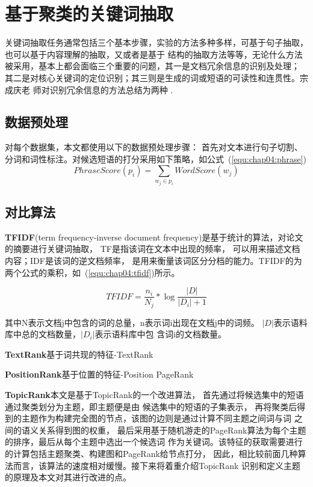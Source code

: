 ﻿\chapter{基于聚类的关键词抽取}
关键词抽取任务通常包括三个基本步骤，实验的方法多种多样，可基于句子抽取，也可以基于内容理解的抽取，又或者是基于%
结构的抽取方法等等，无论什么方法被采用，基本上都会面临三个重要的问题，其一是文档冗余信息的识别及处理；%
其二是对核心关键词的定位识别；其三则是生成的词或短语的可读性和连贯性。宗成庆老%
师对识别冗余信息的方法总结为两种%
.
\section{数据预处理}
对每个数据集，本文都使用以下的数据预处理步骤：%
首先对文本进行句子切割、分词和词性标注。对候选短语的打分采用如下策略，如公式~(\ref{equ:chap04:phrase})
\begin{equation}
\label{equ:chap04:phrase}
PhraseScore(p_i) = \sum\limits_{{w_j}\in {p_i}} WordScore(w_j)
\end{equation}

\section{对比算法}

\textbf{TFIDF}(term frequency-inverse %
document frequency)是基于统计的算法，对论文的摘要进行关键词抽取，%
TF是指该词在文本中出现的频率，%
可以用来描述文档内容；IDF是该词的逆文档频率，%
是用来衡量该词区分分档的能力。TFIDF的为两个公式的乘积，如~(\ref{equ:chap04:tfidf})所示。

\begin{equation}
\label{equ:chap04:tfidf}
TFIDF = {\frac{n_i}{N_j}*\log\frac{|D|}{|D_i| + 1}}
\end{equation}

其中N表示文档j中包含的词的总量，n表示词i出现在文档j中的词频。%
$|D|$表示语料库中总的文档数量，$|D_i|$表示语料库中包%
含词i的文档数量。%

\textbf{TextRank}基于词共现的特征-TextRank

\textbf{PositionRank}基于位置的特征-Position PageRank

\textbf{TopicRank}本文是基于TopicRank的一个改进算法，%
首先通过将候选集中的短语通过聚类划分为主题，即主题便是由%
候选集中的短语的子集表示，
再将聚类后得到的主题作为构建完全图的节点，该图的边则是通过计算不同主题之间词与词%
之间的语义关系得到图的权重，%
最后采用基于随机游走的PageRank算法为每个主题的排序，最后从每个主题中选出一个候选词%
作为关键词。该特征的获取需要进行的计算包括主题聚类、构建图和PageRank给节点打分，%
因此，相比较前面几种算法而言，该算法的速度相对缓慢。接下来将着重介绍TopicRank%
识别和定义主题的原理及本文对其进行改进的点。%

